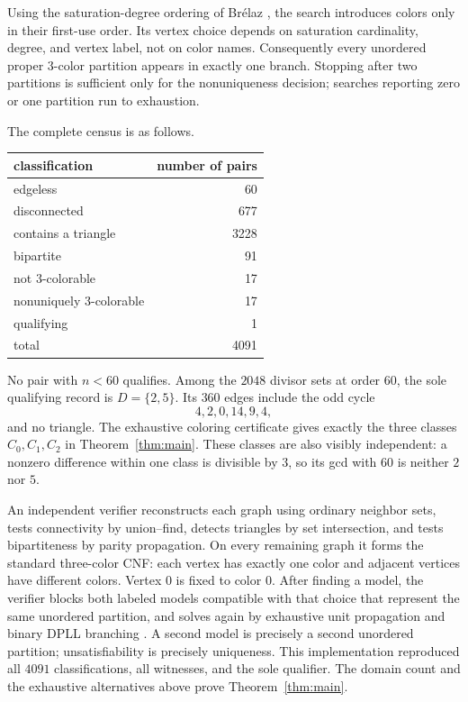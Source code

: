 \documentclass[11pt]{article}
\begin{document}
Using the saturation-degree ordering of Br{\'e}laz \cite{Brelaz1979}, the
search introduces colors only in their first-use order.  Its
vertex choice depends on saturation cardinality, degree, and vertex label,
not on color names.  Consequently every unordered proper $3$-color
partition appears in exactly one branch.  Stopping after two partitions is
sufficient only for the nonuniqueness decision; searches reporting zero or
one partition run to exhaustion.

The complete census is as follows.
\begin{center}
\begin{tabular}{lr}
\toprule
classification & number of pairs \\
\midrule
edgeless & 60 \\
disconnected & 677 \\
contains a triangle & 3228 \\
bipartite & 91 \\
not $3$-colorable & 17 \\
nonuniquely $3$-colorable & 17 \\
qualifying & 1 \\
\midrule
total & 4091 \\
\bottomrule
\end{tabular}
\end{center}
No pair with $n<60$ qualifies.  Among the $2048$ divisor sets at order
$60$, the sole qualifying record is $D=\{2,5\}$.  Its $360$ edges include
the odd cycle
\[
  4,2,0,14,9,4,
\]
and no triangle.  The exhaustive coloring certificate gives exactly the
three classes $C_0,C_1,C_2$ in Theorem~\ref{thm:main}.  These classes are
also visibly independent: a nonzero difference within one class is
divisible by $3$, so its gcd with $60$ is neither $2$ nor $5$.

An independent verifier reconstructs each graph using ordinary neighbor
sets, tests connectivity by union--find, detects triangles by set
intersection, and tests bipartiteness by parity propagation.  On every
remaining graph it forms the standard three-color CNF: each vertex has
exactly one color and adjacent vertices have different colors.  Vertex $0$
is fixed to color $0$.  After finding a model, the verifier blocks both
labeled models compatible with that choice that represent the same
unordered partition, and solves again by exhaustive unit propagation and
binary DPLL branching \cite{DavisLogemannLoveland1962}.  A second model is
precisely a second unordered
partition; unsatisfiability is precisely uniqueness.  This implementation
reproduced all $4091$ classifications, all witnesses, and the sole qualifier.
The domain count and the exhaustive alternatives above prove
Theorem~\ref{thm:main}.
\end{document}
